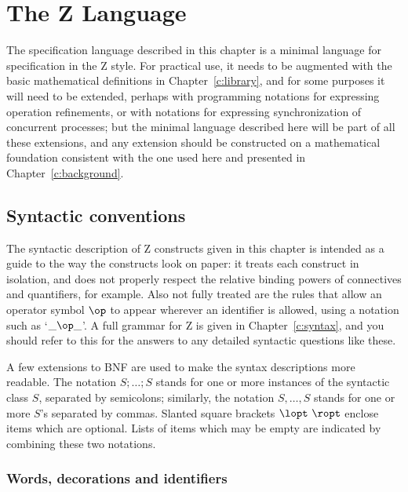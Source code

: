 \chapter{The Z Language}\label{c:language}

The specification language described in this chapter is a minimal
language for specification in the Z style. For practical use, it
needs to be augmented with the basic mathematical definitions in
Chapter~\ref{c:library}, and for some purposes it will need to be
extended, perhaps with programming notations for expressing
operation refinements, or with notations
for expressing synchronization of concurrent
processes;  but the minimal language described
here will be part of all these extensions, and any extension should
be constructed on a mathematical foundation consistent with the one
used here and presented in Chapter~\ref{c:background}.

\section{Syntactic conventions}

The syntactic description of Z constructs given in this chapter is
intended as a guide to the way the constructs look on paper:  it
treats each construct in isolation, and does not properly respect
the relative binding powers of connectives and quantifiers, for
example.  Also not fully treated are the rules that allow an operator
symbol $\op$ to appear wherever an identifier is allowed, using a
notation such as `$\_ \op \_$'.  A full grammar for Z is given in
Chapter~\ref{c:syntax}, and you should refer to this for the answers
to any detailed syntactic questions like these.

A few extensions to
BNF are used to make the syntax
descriptions more readable. The notation \(S; \ldots; S\) stands for
one or more instances of the syntactic class \(S\), separated by
semicolons; similarly, the notation \(S, \ldots, S\) stands for one
or more \(S\)'s separated by commas. Slanted square brackets
\(\lopt~\ropt\) enclose items which are optional. Lists of items
which may be empty are indicated by combining these two notations.

\subsection{Words, decorations and identifiers}

